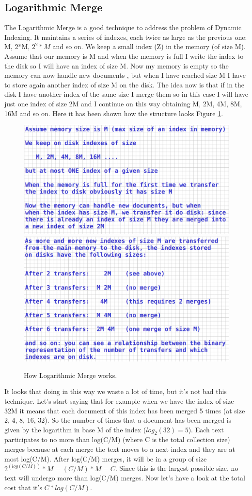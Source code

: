 \subsection{Logarithmic Merge}
The Logarithmic Merge is a good technique to address the problem of Dynamic Indexing. It maintains a series of indexes, each twice as large as the previous one: M, 2*M, $2^2*M$ and so on. We keep a small index (Z) in the memory (of size M).\newline
Assume that our memory is M and when the memory is full I write the index to the disk so I will have an index of size M. Now my memory is empty so the memory can now handle new documents , but when I have reached size M I have to store again another index of size M on the disk. The idea now is that if in the disk I have another index of the same size I merge them so in this case I will have just one index of size 2M and I continue on this way obtaining M, 2M, 4M, 8M, 16M and so on.\newline
Here it has been shown how the structure looks Figure \ref{fig:logmerge}.
\begin{figure}
    \centering
    \includegraphics[width=0.75\linewidth]{images/logmerge1.png}
    \includegraphics[width=0.75\linewidth]{images/logmerge2.png}
    \caption{How Logarithmic Merge works.}
    \label{fig:logmerge}
\end{figure}
It looks that doing in this way we waste a lot of time, but it's not bad this technique. Let's start saying that for example when we have the index of size 32M it means that each document of this index has been merged 5 times (at size 2, 4, 8, 16, 32). So the number of times that a document has been merged is given by the logarithm in base M of the index ($log_2 (32)=5$). Each text participates to no more than log(C/M) (where C is the total collection size) merges because at each merge the text moves to a next index and they are at most log(C/M). After log(C/M) merges, it will be in a group of size $2^{(log(C/M))}*M=(C/M)*M=C$. Since this is the largest possible size, no text will undergo more than log(C/M) merges.\newline
Now let's have a look at the total cost that it's $C*log(C/M)$.
